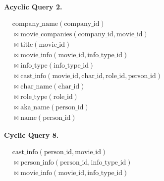\medskip
\noindent\textbf{Acyclic Query 2.}

\noindent$\displaystyle
\begin{aligned}
& \mathrm{company\_name}(\mathrm{company\_id}) \\
& {} \bowtie \mathrm{movie\_companies}(\mathrm{company\_id}, \mathrm{movie\_id}) \\
& {} \bowtie \mathrm{title}(\mathrm{movie\_id}) \\
& {} \bowtie \mathrm{movie\_info}(\mathrm{movie\_id}, \mathrm{info\_type\_id}) \\
& {} \bowtie \mathrm{info\_type}(\mathrm{info\_type\_id}) \\
& {} \bowtie \mathrm{cast\_info}(\mathrm{movie\_id}, \mathrm{char\_id}, \mathrm{role\_id}, \mathrm{person\_id}) \\
& {} \bowtie \mathrm{char\_name}(\mathrm{char\_id}) \\
& {} \bowtie \mathrm{role\_type}(\mathrm{role\_id}) \\
& {} \bowtie \mathrm{aka\_name}(\mathrm{person\_id}) \\
& {} \bowtie \mathrm{name}(\mathrm{person\_id})
\end{aligned}$

\medskip
\noindent\textbf{Cyclic Query 8.}

\noindent$\displaystyle
\begin{aligned}
& \mathrm{cast\_info}(\mathrm{person\_id}, \mathrm{movie\_id}) \\
& {} \bowtie \mathrm{person\_info}(\mathrm{person\_id}, \mathrm{info\_type\_id}) \\
& {} \bowtie \mathrm{movie\_info}(\mathrm{movie\_id}, \mathrm{info\_type\_id})
\end{aligned}$
